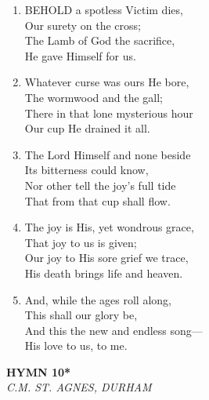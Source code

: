 \documentclass[11pt,a4paper]{article}
\begin{document}
\begin{enumerate}
    \item BEHOLD a spotless Victim dies, \\
        Our surety on the cross; \\
        The Lamb of God the sacrifice, \\
        He gave Himself for us.

    \item Whatever curse was ours He bore, \\
        The wormwood and the gall; \\
        There in that lone mysterious hour \\
        Our cup He drained it all.

    \item The Lord Himself and none beside \\
        Its bitterness could know, \\
        Nor other tell the joy's full tide \\
        That from that cup shall flow.

    \item The joy is His, yet wondrous grace, \\
        That joy to us is given; \\
        Our joy to His sore grief we trace, \\
        His death brings life and heaven.

    \item And, while the ages roll along, \\
        This shall our glory be, \\
        And this the new and endless song--- \\
        His love to us, to me.

\end{enumerate}

\newpage
\begin{center}
    {\Large \textbf{HYMN 10*}}
    \\
    \textit{C.M. ST. AGNES, DURHAM}
\end{center}
\vspace{1em}
\end{document}
